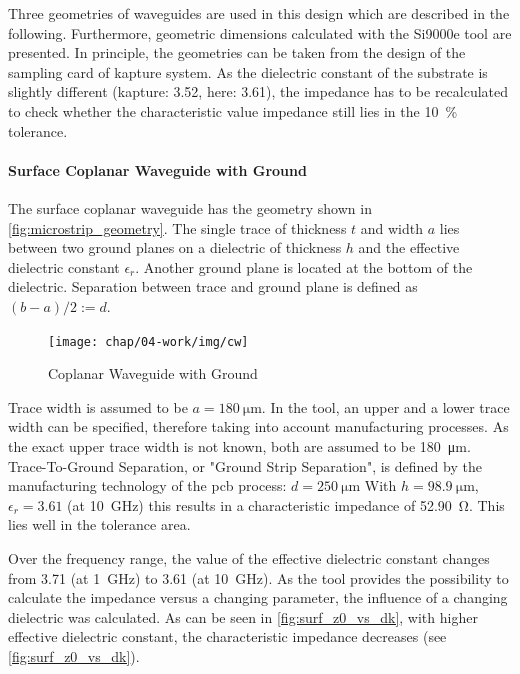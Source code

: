 Three geometries of waveguides are used in this design which are described in the following.
Furthermore, geometric dimensions calculated with the Si9000e tool are presented.
In principle, the geometries can be taken from the design of the sampling card of \gls{kapture} system.
As the dielectric constant of the substrate is slightly different (\gls{kapture}: 3.52, here: 3.61), the impedance has to be recalculated to check whether the characteristic value impedance still lies in the \SI{10}{\percent} tolerance.

\paragraph{Surface Coplanar Waveguide with Ground}
The surface coplanar waveguide has the geometry shown in \autoref{fig:microstrip_geometry}.
The single trace of thickness $t$ and width $a$ lies between two ground planes on a dielectric of thickness $h$ and the effective dielectric constant $\epsilon_r$.
Another ground plane is located at the bottom of the dielectric.
Separation between trace and ground plane is defined as $(b-a)/2 := d$. 

\begin{figure}[!htbp]
	\centering
	\texttt{[image: chap/04-work/img/cw]}
	\caption{Coplanar Waveguide with Ground}
	\label{fig:microstrip_geometry}
\end{figure}

Trace width is assumed to be $a = \SI{180}{\micro\meter}$.
In the tool, an upper and a lower trace width can be specified, therefore taking into account manufacturing processes. %
As the exact upper trace width is not known, both are assumed to be \SI{180}{\micro\meter}.
Trace-To-Ground Separation, or "Ground Strip Separation", is defined by the manufacturing technology of the \gls{pcb} process: $d = \SI{250}{\micro\meter}$
With $h = \SI{98.9}{\micro \meter}$, $\epsilon_r = 3.61$ (at \SI{10}{\GHz}) this results in a characteristic impedance of \SI{52.90}{\ohm}. This lies well in the tolerance area. %

Over the frequency range, the value of the effective dielectric constant changes from 3.71 (at \SI{1}{\GHz}) to 3.61 (at \SI{10}{\GHz}).
As the tool provides the possibility to calculate the impedance versus a changing parameter, the influence of a changing dielectric was calculated. %
As can be seen in \autoref{fig:surf_z0_vs_dk}, with higher effective dielectric constant, the characteristic impedance decreases (see \autoref{fig:surf_z0_vs_dk}).

